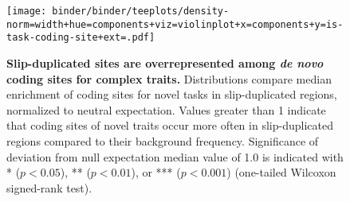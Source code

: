 \begin{figure}
\texttt{[image: binder/binder/teeplots/density-norm=width+hue=components+viz=violinplot+x=components+y=is-task-coding-site+ext=.pdf]}
\caption{%
  \textbf{Slip-duplicated sites are overrepresented among \textit{de novo} coding sites for complex traits.}
  \footnotesize
  Distributions compare median enrichment of coding sites for novel tasks in slip-duplicated regions, normalized to neutral expectation.
  Values greater than 1 indicate that coding sites of novel traits occur more often in slip-duplicated regions compared to their background frequency.
  Significance of deviation from null expectation median value of 1.0 is indicated with * ($p < 0.05$), ** ($p < 0.01$), or *** ($p < 0.001$) (one-tailed Wilcoxon signed-rank test).
} \label{fig:potentiation}
\end{figure}
